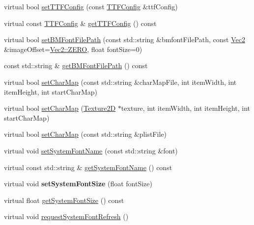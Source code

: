 \begin{Indent}
\begin{DoxyCompactItemize}
\item 
virtual bool \hyperlink{classLabel_a7e5006e20e63259ffefd217405e83efd}{set\+T\+T\+F\+Config} (const \hyperlink{structTTFConfig}{T\+T\+F\+Config} \&ttf\+Config)
\item 
virtual const \hyperlink{structTTFConfig}{T\+T\+F\+Config} \& \hyperlink{classLabel_a94ccd8344df3bf3b840f6a71f7a16d23}{get\+T\+T\+F\+Config} () const
\item 
virtual bool \hyperlink{classLabel_a8fc5d958c2fd664a13c6bd80cde77dba}{set\+B\+M\+Font\+File\+Path} (const std\+::string \&bmfont\+File\+Path, const \hyperlink{classVec2}{Vec2} \&image\+Offset=\hyperlink{classVec2_a5c80e2e7c8bd2adcbad2844d060e6245}{Vec2\+::\+Z\+E\+RO}, float font\+Size=0)
\item 
const std\+::string \& \hyperlink{classLabel_a30dc940bd64a7b34f7facee0c9c8d2ab}{get\+B\+M\+Font\+File\+Path} () const
\item 
virtual bool \hyperlink{classLabel_a580968d9d76fdf5e78a50feb6a619522}{set\+Char\+Map} (const std\+::string \&char\+Map\+File, int item\+Width, int item\+Height, int start\+Char\+Map)
\item 
virtual bool \hyperlink{classLabel_aae5c736cb6ee13752bde8390e96e75ff}{set\+Char\+Map} (\hyperlink{classTexture2D}{Texture2D} $\ast$texture, int item\+Width, int item\+Height, int start\+Char\+Map)
\item 
virtual bool \hyperlink{classLabel_a7b1ed3468c3144c2813d3270d1cf269b}{set\+Char\+Map} (const std\+::string \&plist\+File)
\item 
virtual void \hyperlink{classLabel_a7e89d708a8ddcb5b5ad6e565c2721354}{set\+System\+Font\+Name} (const std\+::string \&font)
\item 
virtual const std\+::string \& \hyperlink{classLabel_af88224444451a961ebf950e503e8dc29}{get\+System\+Font\+Name} () const
\item 
\mbox{\label{classLabel_aaad91da407f16b20fe429ad02c7bb97f}} 
virtual void {\bfseries set\+System\+Font\+Size} (float font\+Size)
\item 
virtual float \hyperlink{classLabel_a9d6aa78ef93d2903019b63d5bcd93fa1}{get\+System\+Font\+Size} () const
\item 
virtual void \hyperlink{classLabel_adf22772294ad56788486046beca0656f}{request\+System\+Font\+Refresh} ()
\end{DoxyCompactItemize}
\end{Indent}
